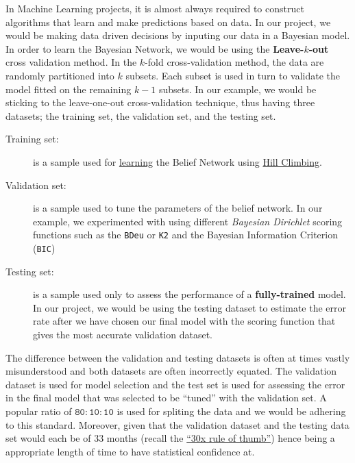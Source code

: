 In Machine Learning projects, it is  almost always required to construct algorithms that learn and make predictions based on data. In our project, we would be making data driven decisions by inputing our data in a Bayesian model. \\

In order to learn the Bayesian Network, we would be using the \textbf{Leave-$k$-out} cross validation method. In the $k$-fold cross-validation method, the data are randomly partitioned into $k$ subsets. Each subset is used in turn to validate the model fitted on the remaining $k - 1$ subsets.  In our example, we would be sticking to the leave-one-out cross-validation technique, thus having three datasets; the training set, the validation set, and the testing set. \\


\begin{description}
	\item[Training set:] is a sample used for \hyperref[learn]{learning} the Belief Network using \hyperref[learn]{Hill Climbing}.
	\item[Validation set:]is a sample used to tune the parameters of the belief network. In our example, we experimented with using different \textit{Bayesian Dirichlet} scoring functions such as the \texttt{BDeu} or \texttt{K2} and the Bayesian Information Criterion (\texttt{BIC}) 
	\item[Testing set:]is a sample used only to assess the performance of a \textbf{fully-trained} model. In our project, we would be using the testing dataset to estimate the error rate after we have chosen our final model with the scoring function that gives the most accurate validation dataset. 
\end{description}

The difference between the validation and testing datasets is often at times vastly misunderstood and both datasets are often incorrectly equated. The validation dataset is used for model selection and the test set is used for assessing the error in the final model that was selected to be \enquote{tuned} with the validation set\cite{friedman2001elements}. A popular ratio of $\mathtt{80:10:10}$ is used for spliting the data and we would be adhering to this standard. Moreover, given that the validation dataset and the testing data set would each be of 33 months (recall the \hyperref[30x]{\enquote{30x rule of thumb}}) hence being a appropriate length of time to have statistical confidence at. \\

